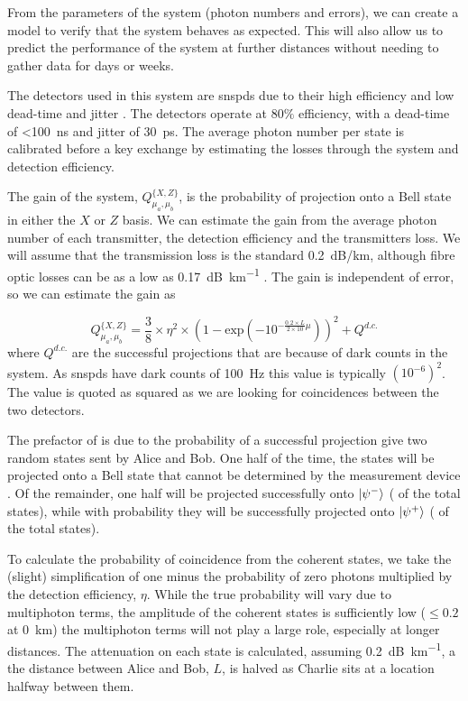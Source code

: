 From the parameters of the system (photon numbers and errors), we can create a model to verify that the system behaves as expected. This will also allow us to predict the performance of the system at further distances without needing to gather data for days or weeks. 

The detectors used in this system are \acp{snspd} due to their high efficiency and low dead-time and jitter \cite{sprengers2011}. The detectors operate at $80\%$ efficiency, with a dead-time of \SI{<100}{ns} and jitter of \SI{30}{ps}. The average photon number per state is calibrated before a key exchange by estimating the losses through the system and detection efficiency.

The gain of the system, $Q^{ \{X,Z\} }_{\mu_a,\mu_b}$, is the probability of projection onto a Bell state in either the $X$ or $Z$ basis. We can estimate the gain from the average photon number of each transmitter, the detection efficiency and the transmitters loss. We will assume that the transmission loss is the standard \SI{0.2}{dB/km}, although fibre optic losses can be as a low as \SI{0.17}{dB\per\km} \cite{corningULL}. The gain is independent of error, so we can estimate the gain as 

\begin{equation}
	Q^{ \{X,Z\} }_{\mu_a,\mu_b} = \frac{3}{8}  \times \eta^2 \times \left( 1 - \text{exp} \left( -10^{- \frac{0.2 \times L}{2 \times 10} \mu}  \right)  \right)^2 + Q^{d.c.}
\end{equation}
where $Q^{d.c.}$ are the successful projections that are because of dark counts in the system. As \acp{snspd} have dark counts of \SI{100}{Hz} this value is typically $\left(10^{-6}\right)^2$. The value is quoted as squared as we are looking for coincidences between the two detectors. 

The prefactor of  is due to the probability of a successful projection give two random states sent by Alice and Bob. One half of the time, the states will be projected onto a Bell state that cannot be determined by the measurement device \cite{}. Of the remainder, one half will be projected successfully onto $\ket{\psi^-}$ ( of the total states), while with probability  they will be successfully projected onto $\ket{\psi^+}$ ( of the total states). 

To calculate the probability of coincidence from the coherent states, we take the (slight) simplification of one minus the probability of zero photons multiplied by the detection efficiency, $\eta$. While the true probability will vary due to multiphoton terms, the amplitude of the coherent states is sufficiently low ($\le 0.2$ at \SI{0}{\km}) the multiphoton terms will not play a large role, especially at longer distances. The attenuation on each state is calculated, assuming \SI{0.2}{dB\per\km}, a the distance between Alice and Bob, $L$, is halved as Charlie sits at a location halfway between them.

